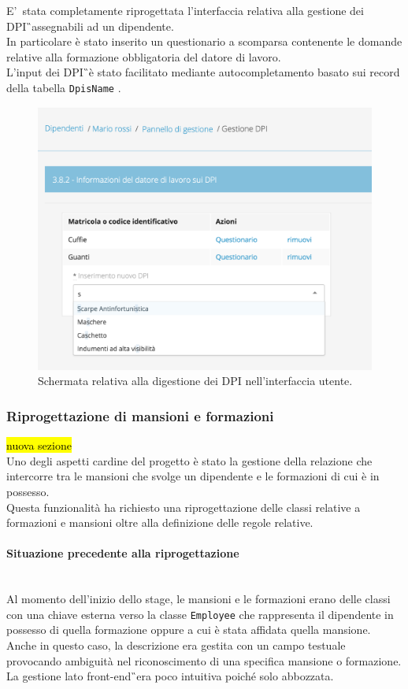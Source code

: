 E'\ stata completamente riprogettata l'interfaccia relativa alla gestione dei \gls{DPI}\G\ assegnabili ad un dipendente.\\
In particolare è stato inserito un questionario a scomparsa contenente le domande relative alla formazione obbligatoria del datore di lavoro. \\
L'input dei \gls{DPI}\G\ è stato facilitato mediante autocompletamento basato sui record della tabella \texttt{DpisName} .
\begin{figure}[H]
	\begin{center}
		\includegraphics[width=12cm]{Pics/ScreenDPI.png}
		\caption{Schermata relativa alla digestione dei DPI nell'interfaccia utente.}
		\label{fig:ScreenDPI}
	\end{center}
\end{figure}

\newpage
\subsubsection{Riprogettazione di mansioni e formazioni}
\hl{nuova sezione}\\
Uno degli aspetti cardine del progetto è stato la gestione della relazione che intercorre tra le mansioni che svolge un dipendente e le formazioni di cui è in possesso.\\
Questa funzionalità ha richiesto una riprogettazione delle classi relative a formazioni e mansioni oltre alla definizione delle regole relative.\\


\paragraph*{Situazione precedente alla riprogettazione} \mbox{} \\
	Al momento dell'inizio dello stage, le mansioni e le formazioni erano delle classi con una chiave esterna verso la classe \texttt{Employee} che rappresenta il dipendente in possesso di quella formazione oppure a cui è stata affidata quella mansione.\\
	Anche in questo caso, la descrizione era gestita con un campo testuale provocando ambiguità nel riconoscimento di una specifica mansione o formazione.\\
	La gestione lato \gls{front-end}\G\ era poco intuitiva poiché solo abbozzata.
	
